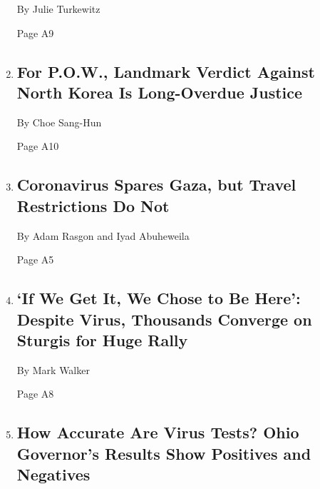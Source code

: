 \begin{enumerate}
  By Julie Turkewitz

  Page A9
\item
  \href{/2020/08/07/world/asia/north-korea-pow-verdict-kim.html}{}

  \hypertarget{for-pow-landmark-verdict-against-north-korea-is-long-overdue-justice}{%
  \subsection{For P.O.W., Landmark Verdict Against North Korea Is
  Long-Overdue
  Justice}\label{for-pow-landmark-verdict-against-north-korea-is-long-overdue-justice}}

  By Choe Sang-Hun

  Page A10
\item
  \href{/2020/08/08/world/middleeast/coronavirus-gaza.html}{}

  \hypertarget{coronavirus-spares-gaza-but-travel-restrictions-do-not}{%
  \subsection{Coronavirus Spares Gaza, but Travel Restrictions Do
  Not}\label{coronavirus-spares-gaza-but-travel-restrictions-do-not}}

  By Adam Rasgon and Iyad Abuheweila

  Page A5
\item
  \href{/2020/08/07/us/sturgis-motorcyle-rally.html}{}

  \hypertarget{if-we-get-it-we-chose-to-be-here-despite-virus-thousands-converge-on-sturgis-for-huge-rally}{%
  \subsection{`If We Get It, We Chose to Be Here': Despite Virus,
  Thousands Converge on Sturgis for Huge
  Rally}\label{if-we-get-it-we-chose-to-be-here-despite-virus-thousands-converge-on-sturgis-for-huge-rally}}

  By Mark Walker

  Page A8
\item
  \href{/2020/08/07/us/covid-test-accuracy-governor-dewine-ohio.html}{}

  \hypertarget{how-accurate-are-virus-tests-ohio-governors-results-show-positives-and-negatives}{%
  \subsection{How Accurate Are Virus Tests? Ohio Governor's Results Show
  Positives and
  Negatives}\label{how-accurate-are-virus-tests-ohio-governors-results-show-positives-and-negatives}}


\end{enumerate}
